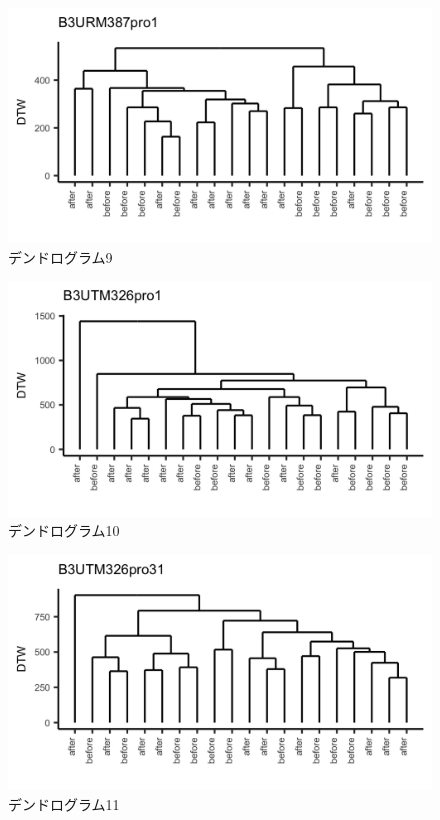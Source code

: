 \documentclass{jarticle}
\begin{document}
\begin{figure}[H]
	\begin{center}
		\includegraphics[width=15cm]{fig/dendro_9.png}
		\caption{デンドログラム9}
		\label{fig:dendro9}
	\end{center}
\end{figure}
\begin{figure}[H]
	\begin{center}
		\includegraphics[width=15cm]{fig/dendro_10.png}
		\caption{デンドログラム10}
		\label{fig:dendro10}
	\end{center}
\end{figure}
\begin{figure}[H]
	\begin{center}
		\includegraphics[width=15cm]{fig/dendro_11.png}
		\caption{デンドログラム11}
		\label{fig:dendro11}
	\end{center}
\end{figure}
\end{document}
